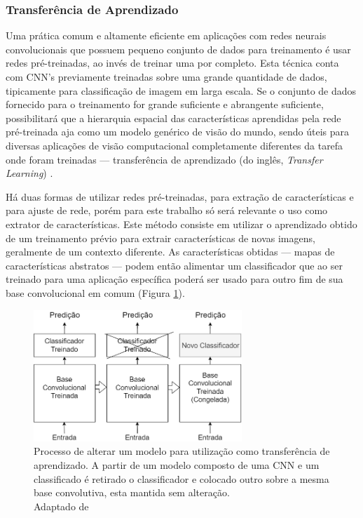\documentclass[12pt]{report}
\newcommand*{\captionsource}[2]{%
  \caption[{#1}]{%
    #1%
    \\\hspace{\linewidth}%
     \text{Fonte:}#2%
  }%
}
\begin{document}
\subsubsection{Transferência de Aprendizado}

Uma prática comum e altamente eficiente em aplicações com redes neurais convolucionais que possuem pequeno conjunto de dados para treinamento é usar redes pré-treinadas, ao invés de treinar uma por completo. Esta técnica conta com \ac{CNN}'s  previamente treinadas sobre uma grande quantidade de dados, tipicamente para classificação de imagem em larga escala. Se o conjunto de dados fornecido para o treinamento for grande suficiente e abrangente suficiente, possibilitará que a hierarquia espacial das características aprendidas pela rede pré-treinada aja como um modelo genérico de visão do mundo, sendo úteis para diversas aplicações de visão computacional completamente diferentes da tarefa onde foram treinadas --- transferência de aprendizado (do inglês, \textit{Transfer Learning}) \cite{chollet}.

Há duas formas de utilizar redes pré-treinadas, para extração de características e para ajuste de rede, porém para este trabalho só será relevante o uso como extrator de características. Este método consiste em utilizar o aprendizado obtido de um treinamento prévio para extrair características de novas imagens, geralmente de um contexto diferente. As características obtidas --- mapas de características abstratos --- podem então alimentar um classificador que ao ser treinado para uma aplicação específica poderá ser usado para outro fim de sua base convolucional em comum (Figura \ref{fig:transfer}). 

\begin{figure}
    \centering
    \includegraphics[width=0.7\textwidth]{images/transfer.png}
    \captionsource{Processo de alterar um modelo para utilização como transferência de aprendizado. A partir de um modelo composto de uma CNN e um classificado é retirado o classificador e colocado outro sobre a mesma base convolutiva, esta mantida sem alteração.}{ Adaptado de \protect\cite{chollet}}
    \label{fig:transfer}
\end{figure}
\end{document}
